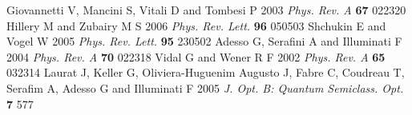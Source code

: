 \documentclass[twocolumn,showpacs,preprintnumbers,amsmath,amssymb,pra]{revtex4}
\begin{document}
\begin{thebibliography}{1}
  Giovannetti V,  Mancini S,  Vitali D and  Tombesi P 2003 {\it{Phys. Rev. A}} {\bf{67}} 022320 
  Hillery M and  Zubairy M S 2006 {\it{Phys. Rev. Lett.}} {\bf{96}} 050503 
  Shchukin E and  Vogel W 2005 {\it{Phys. Rev. Lett.}} {\bf{95}} 230502 
  Adesso G,  Serafini A and  Illuminati F 2004 {\it{Phys. Rev. A}} {\bf{70}} 022318 
  Vidal G and  Wener R F 2002 {\it{Phys. Rev. A}} {\bf{65}} 032314 
 Laurat J,  Keller G,  Oliviera-Huguenim Augusto J,  Fabre C,  Coudreau T,  Serafim A,  Adesso G and  Illuminati F 2005 {\it{J. Opt. B: Quantum Semiclass. Opt.}}  {\bf{7}} 577 


\end{thebibliography}
\end{document}
